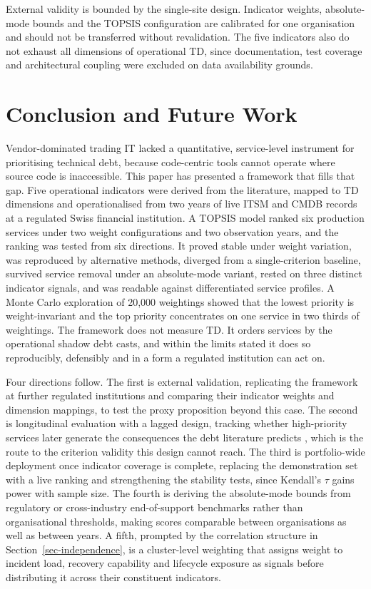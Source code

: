 \documentclass[
  authoryear,
  preprint]{elsarticle}
\begin{document}
External validity is bounded by the single-site design. Indicator
weights, absolute-mode bounds and the TOPSIS configuration are
calibrated for one organisation and should not be transferred without
revalidation. The five indicators also do not exhaust all dimensions of
operational TD, since documentation, test coverage and architectural
coupling were excluded on data availability grounds.

\section{Conclusion and Future Work}\label{sec-conclusion}

Vendor-dominated trading IT lacked a quantitative, service-level
instrument for prioritising technical debt, because code-centric tools
cannot operate where source code is inaccessible. This paper has
presented a framework that fills that gap. Five operational indicators
were derived from the literature, mapped to TD dimensions and
operationalised from two years of live ITSM and CMDB records at a
regulated Swiss financial institution. A TOPSIS model ranked six
production services under two weight configurations and two observation
years, and the ranking was tested from six directions. It proved stable
under weight variation, was reproduced by alternative methods, diverged
from a single-criterion baseline, survived service removal under an
absolute-mode variant, rested on three distinct indicator signals, and
was readable against differentiated service profiles. A Monte Carlo
exploration of 20,000 weightings showed that the lowest priority is
weight-invariant and the top priority concentrates on one service in two
thirds of weightings. The framework does not measure TD. It orders
services by the operational shadow debt casts, and within the limits
stated it does so reproducibly, defensibly and in a form a regulated
institution can act on.

Four directions follow. The first is external validation, replicating
the framework at further regulated institutions and comparing their
indicator weights and dimension mappings, to test the proxy proposition
beyond this case. The second is longitudinal evaluation with a lagged
design, tracking whether high-priority services later generate the
consequences the debt literature predicts
\citep{bankerTechnicalDebtFirm2020}, which is the route to the criterion
validity this design cannot reach. The third is portfolio-wide
deployment once indicator coverage is complete, replacing the
demonstration set with a live ranking and strengthening the stability
tests, since Kendall's \(\tau\) gains power with sample size. The fourth
is deriving the absolute-mode bounds from regulatory or cross-industry
end-of-support benchmarks rather than organisational thresholds, making
scores comparable between organisations as well as between years. A
fifth, prompted by the correlation structure in
Section~\ref{sec-independence}, is a cluster-level weighting that
assigns weight to incident load, recovery capability and lifecycle
exposure as signals before distributing it across their constituent
indicators.
\end{document}
